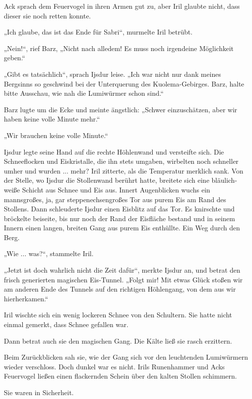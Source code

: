 Ack sprach dem Feuervogel in ihren Armen gut zu, aber Iril glaubte nicht, dass dieser sie noch retten konnte.

„Ich glaube, das ist das Ende für Sabri“, murmelte Iril betrübt.

„Nein!“, rief Barz, „Nicht nach alledem! Es muss noch irgendeine Möglichkeit geben.“

„Gibt es tatsächlich“, sprach Ijsdur leise. „Ich war nicht nur dank meines Bergsinns so geschwind bei der Unterquerung des Kuolema-Gebirges. Barz, halte bitte Ausschau, wie nah die Lumiwürmer schon sind.“

Barz lugte um die Ecke und meinte ängstlich: „Schwer einzuschätzen, aber wir haben keine volle Minute mehr.“

„Wir brauchen keine volle Minute.“

Ijsdur legte seine Hand auf die rechte Höhlenwand und versteifte sich. Die Schneeflocken und Eiskristalle, die ihn stets umgaben, wirbelten noch schneller umher und wurden ... mehr? Iril zitterte, als die Temperatur merklich sank. Von der Stelle, wo Ijsdur die Stollenwand berührt hatte, breitete sich eine bläulich-weiße Schicht aus Schnee und Eis aus. Innert Augenblicken wuchs ein mannsgroßes, ja, gar steppenechsengroßes Tor aus purem Eis am Rand des Stollens. Dann schleuderte Ijsdur einen Eisblitz auf das Tor. Es knirschte und bröckelte beiseite, bis nur noch der Rand der Eisfläche bestand und in seinem Innern einen langen, breiten Gang aus purem Eis enthüllte. Ein Weg durch den Berg.

„Wie ... was?“, stammelte Iril.

„Jetzt ist doch wahrlich nicht die Zeit dafür“, merkte Ijsdur an, und betrat den frisch generierten magischen Eis-Tunnel. „Folgt mir! Mit etwas Glück stoßen wir am anderen Ende des Tunnels auf den richtigen Höhlengang, von dem aus wir hierherkamen.“

Iril wischte sich ein wenig lockeren Schnee von den Schultern. Sie hatte nicht einmal gemerkt, dass Schnee gefallen war.

Dann betrat auch sie den magischen Gang. Die Kälte ließ sie rasch erzittern.

Beim Zurückblicken sah sie, wie der Gang sich vor den leuchtenden Lumiwürmern wieder verschloss. Doch dunkel war es nicht. Irils Runenhammer und Acks Feuervogel ließen einen flackernden Schein über den kalten Stollen schimmern.

Sie waren in Sicherheit.























